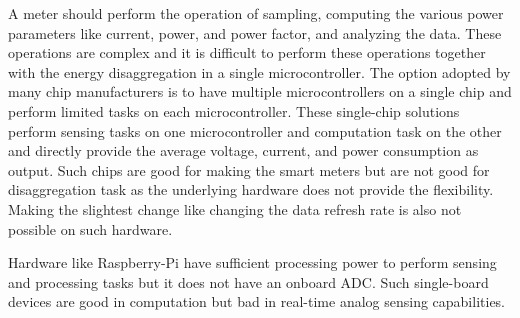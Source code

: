 A meter should perform the operation of sampling, computing the various power parameters like current, power, and power factor, and analyzing the data. These operations are complex and it is difficult to perform these operations together with the energy disaggregation in a single microcontroller. The option adopted by many chip manufacturers is to have multiple microcontrollers on a single chip and perform limited tasks on each microcontroller. These single-chip solutions perform sensing tasks on one microcontroller and computation task on the other and directly provide the average voltage, current, and power consumption as output. Such chips are good for making the smart meters but are not good for disaggregation task as the underlying hardware does not provide the flexibility. Making the slightest change like changing the data refresh rate is also not possible on such hardware.

Hardware like Raspberry-Pi have sufficient processing power to perform sensing and processing tasks but it does not have an onboard ADC. Such single-board devices are good in computation but bad in real-time analog sensing capabilities.


